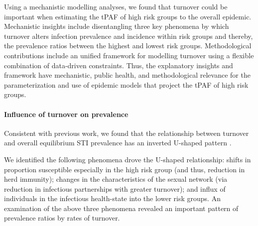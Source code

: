 Using a mechanistic modelling analyses, 
we found that turnover could be important 
when estimating the tPAF
of high risk groups to the overall epidemic.
Mechanistic insights include disentangling 
three key phenomena by which turnover 
alters infection prevalence and incidence within risk groups and 
thereby, the prevalence ratios between the highest and lowest risk groups.
Methodological contributions include an unified 
framework for modelling turnover 
using a flexible combination of data-driven constraints.
Thus, the explanatory insights and framework
have mechanistic, public health, and methodological relevance 		%
for the parameterization
and use of epidemic models that project the tPAF of high risk groups.

\paragraph{Influence of turnover on prevalence}				%

Consistent with previous work, we found that the relationship between
turnover and overall equilibrium STI prevalence has
an inverted U-shaped pattern
\citep{Stigum1994,Zhang2012,Henry2015}.

We identified the following phenomena drove the U-shaped relationship:
shifts in proportion susceptible especially in the high risk group (and thus, reduction in herd immunity); 
changes in the characteristics of the sexual network (via reduction in infectious partnerships with greater turnover); 
and influx of individuals in the infectious health-state into the lower risk groups.
An examination of the above three phenomena revealed an important pattern 
of prevalence ratios by rates of turnover.

